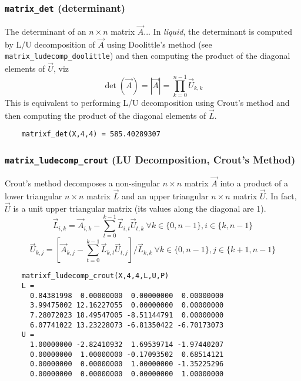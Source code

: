 \subsubsection{{\tt matrix\_det} (determinant)}
\label{module:matrix:det}
The determinant of an $n \times n$ matrix $\vec{A}$...
In {\it liquid}, the determinant is computed by L/U decomposition of $\vec{A}$
using Doolittle's method (see {\tt matrix\_ludecomp\_doolittle}) and then
computing the product of the diagonal elements of $\vec{U}$, viz
\[
    \det\left(\vec{A}\right) =
    \left|\vec{A}\right| =
    \prod_{k=0}^{n-1}{\vec{U}_{k,k}}
\]
This is equivalent to performing L/U decomposition using Crout's method and
then computing the product of the diagonal elements of $\vec{L}$.
\begin{verbatim}
    matrixf_det(X,4,4) = 585.40289307
\end{verbatim}

\subsubsection{{\tt matrix\_ludecomp\_crout} (LU Decomposition, Crout's Method)}
\label{module:matrix:ludecomp_crout}
Crout's method decomposes a non-singular $n\times n$ matrix $\vec{A}$ into a
product of a lower triangular $n \times n$ matrix $\vec{L}$ and an upper
triangular $n \times n$ matrix $\vec{U}$. %
In fact, $\vec{U}$ is a unit upper triangular matrix (its values along the
diagonal are 1).
%
\[
    \vec{L}_{i,k} = \vec{A}_{i,k} -
                    \sum_{t=0}^{k-1}{ \vec{L}_{i,t} \vec{U}_{t,k} }
                    \ \forall k \in \{0,n-1\}, i \in \{k,n-1\}
\]
%
\[
    \vec{U}_{k,j} = \left[
                        \vec{A}_{k,j} -
                        \sum_{t=0}^{k-1}{ \vec{L}_{k,t} \vec{U}_{t,j} }
                    \right] / \vec{L}_{k,k}
                    \ \forall k \in \{0,n-1\}, j \in \{k+1,n-1\}
\]
%
\begin{verbatim}
    matrixf_ludecomp_crout(X,4,4,L,U,P)
    L =
      0.84381998  0.00000000  0.00000000  0.00000000
      3.99475002 12.16227055  0.00000000  0.00000000
      7.28072023 18.49547005 -8.51144791  0.00000000
      6.07741022 13.23228073 -6.81350422 -6.70173073
    U =
      1.00000000 -2.82410932  1.69539714 -1.97440207
      0.00000000  1.00000000 -0.17093502  0.68514121
      0.00000000  0.00000000  1.00000000 -1.35225296
      0.00000000  0.00000000  0.00000000  1.00000000
\end{verbatim}

